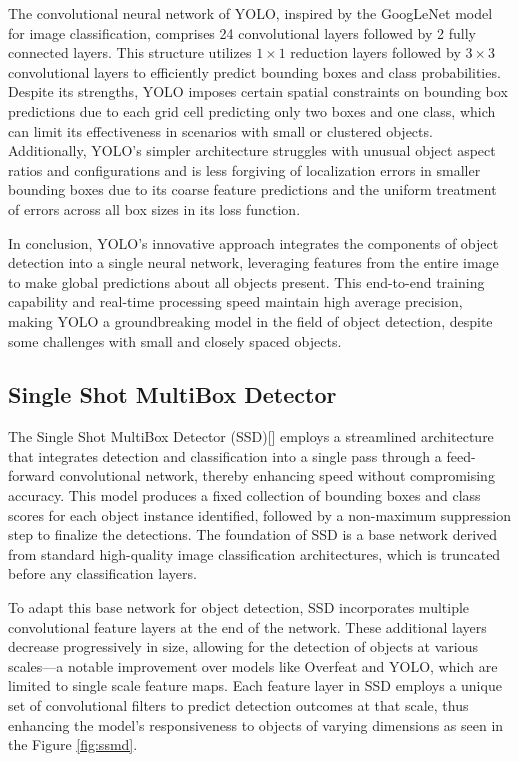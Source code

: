 The convolutional neural network of YOLO, inspired by the GoogLeNet model for image classification, comprises 24 convolutional layers followed by 2 fully 
connected layers. This structure utilizes \(1 \times 1\) reduction layers followed by \(3 \times 3\) convolutional layers to efficiently predict bounding 
boxes and class probabilities. Despite its strengths, YOLO imposes certain spatial constraints on bounding box predictions due to each grid cell predicting 
only two boxes and one class, which can limit its effectiveness in scenarios with small or clustered objects. Additionally, YOLO's simpler architecture 
struggles with unusual object aspect ratios and configurations and is less forgiving of localization errors in smaller bounding boxes due to its coarse 
feature predictions and the uniform treatment of errors across all box sizes in its loss function.

In conclusion, YOLO’s innovative approach integrates the components of object detection into a single neural network, leveraging features from the entire 
image to make global predictions about all objects present. This end-to-end training capability and real-time processing speed maintain high average 
precision, making YOLO a groundbreaking model in the field of object detection, despite some challenges with small and closely spaced objects.

\newpage
\subsection{Single Shot MultiBox Detector}

The Single Shot MultiBox Detector (SSD)[] employs a streamlined architecture that integrates detection and classification into a single pass through a 
feed-forward convolutional network, thereby enhancing speed without compromising accuracy. This model produces a fixed collection of bounding boxes and 
class scores for each object instance identified, followed by a non-maximum suppression step to finalize the detections. The foundation of SSD is a 
base network derived from standard high-quality image classification architectures, which is truncated before any classification layers. 

To adapt this base network for object detection, SSD incorporates multiple convolutional feature layers at the end of the network. These additional layers 
decrease progressively in size, allowing for the detection of objects at various scales—a notable improvement over models like Overfeat and YOLO, which 
are limited to single scale feature maps. Each feature layer in SSD employs a unique set of convolutional filters to predict detection outcomes at that scale, 
thus enhancing the model's responsiveness to objects of varying dimensions as seen in the Figure \ref{fig:ssmd}.

